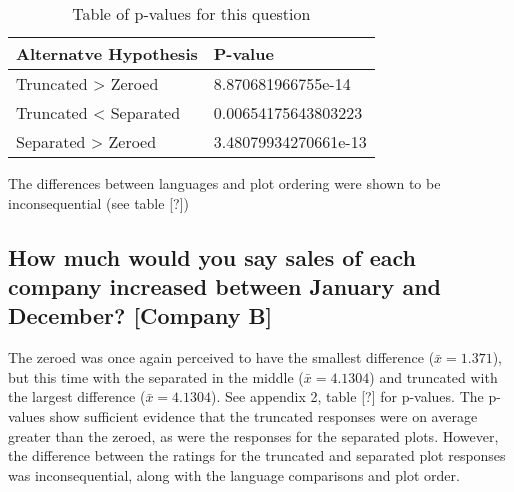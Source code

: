 \documentclass[
]{article}
\newenvironment{Shaded}{\begin{snugshade}}{\end{snugshade}}
\newcommand{\DataTypeTok}[1]{\textcolor[rgb]{0.13,0.29,0.53}{#1}}
\newcommand{\FloatTok}[1]{\textcolor[rgb]{0.00,0.00,0.81}{#1}}
\newcommand{\KeywordTok}[1]{\textcolor[rgb]{0.13,0.29,0.53}{\textbf{#1}}}
\newcommand{\NormalTok}[1]{#1}
\newcommand{\OperatorTok}[1]{\textcolor[rgb]{0.81,0.36,0.00}{\textbf{#1}}}
\newcommand{\StringTok}[1]{\textcolor[rgb]{0.31,0.60,0.02}{#1}}
\begin{document}
\begin{Shaded}
\end{Shaded}

\begin{table}[!h]

\caption{\label{tab:unnamed-chunk-53}Table of p-values for this question}
\centering
\begin{tabular}[t]{l|l}
\hline
Alternatve Hypothesis & P-value\\
\hline
Truncated > Zeroed & 8.870681966755e-14\\
\hline
Truncated < Separated & 0.00654175643803223\\
\hline
Separated > Zeroed & 3.48079934270661e-13\\
\hline
\end{tabular}
\end{table}

The differences between languages and plot ordering were shown to be
inconsequential (see table {[}?{]})

\subsection{How much would you say sales of each company increased between January and December? [Company B]}

The zeroed was once again perceived to have the smallest difference
(\(\bar{x} = 1.371\)), but this time with the separated in the middle
(\(\bar{x} = 4.1304\)) and truncated with the largest difference
(\(\bar{x} = 4.1304\)). See appendix 2, table {[}?{]} for p-values. The
p-values show sufficient evidence that the truncated responses were on
average greater than the zeroed, as were the responses for the separated
plots. However, the difference between the ratings for the truncated and
separated plot responses was inconsequential, along with the language
comparisons and plot order.
\end{document}
